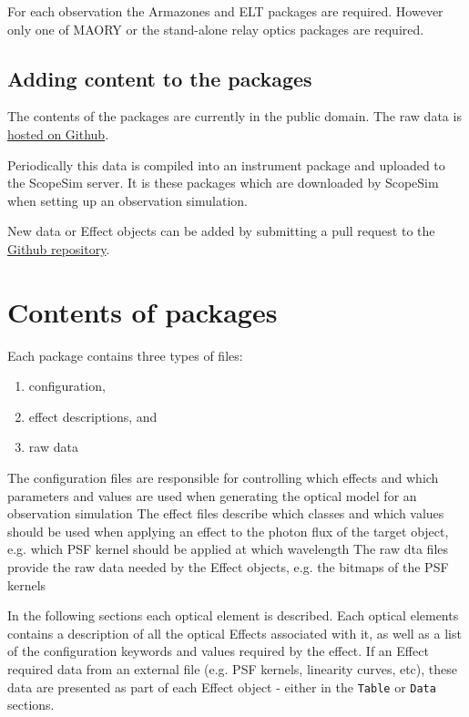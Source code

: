 For each observation the Armazones and ELT packages are required. However only one of MAORY or the stand-alone relay optics packages are required.


\subsection{Adding content to the packages%
  \label{adding-content-to-the-packages}%
}

The contents of the packages are currently in the public domain.
The raw data is \href{https://github.com/astronomyk/irdb}{hosted on Github}.

Periodically this data is compiled into an instrument package and uploaded to the ScopeSim server.
It is these packages which are downloaded by ScopeSim when setting up an observation simulation.

New data or Effect objects can be added by submitting a pull request to the \href{https://github.com/astronomyk/irdb}{Github repository}.


\section{Contents of packages%
  \label{contents-of-packages}%
}

Each package contains three types of files:

\begin{enumerate}
\item configuration,

\item effect descriptions, and

\item raw data
\end{enumerate}

The configuration files are responsible for controlling which effects and which parameters and values are used when generating the optical model for an observation simulation
The effect files describe which classes and which values should be used when applying an effect to the photon flux of the target object, e.g. which PSF kernel should be applied at which wavelength
The raw dta files provide the raw data needed by the Effect objects, e.g. the bitmaps of the PSF kernels

In the following sections each optical element is described.
Each optical elements contains a description of all the optical Effects associated with it, as well as a list of the configuration keywords and values required by the effect.
If an Effect required data from an external file (e.g. PSF kernels, linearity curves, etc), these data are presented as part of each Effect object - either in the \texttt{Table} or \texttt{Data} sections.


